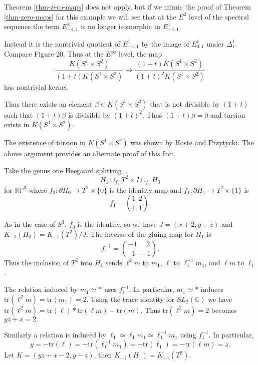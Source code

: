 \documentclass{slides}
\newcommand{\tr}{\mathrm{tr}}
\newcommand{\slc}{SL_2(\mathbb{C})}
\begin{document}
\begin{slide}
Theorem \ref{thm-zero-maps} does not apply, but if we mimic the proof
of Theorem \ref{thm-zero-maps} for this example
we will see that at the $E^2$ level of the spectral sequence the term
$E^2_{-1,1}$ is no longer isomorphic to $E^1_{-1,1}$.

Instead it is the nontrivial
quotient of $E^1_{-1,1}$ by the image of $E^1_{0,1}$ under $\Delta^1_1$.  Compare
Figure 20.  Thus at the $E^{\infty}$ level, the map
\[
\frac{K(S^1 \times S^2)}{(1+t)K(S^1 \times S^2)} \to
\frac{(1+t)K(S^1 \times S^2)}{(1+t)^2K(S^1 \times S^2)}
\]
has nontrivial kernel.

Thus there exists an element $\beta \in K(S^1 \times S^2)$
that is not divisible by $(1+t)$ such that $(1+t) \beta$ is divisible by $(1+t)^2$.
Thus $(1+t) \beta = 0$ and torsion exists in $K(S^1 \times S^2)$.

The existence of torsion in $K(S^1 \times S^2)$ was shown by Hoste and Przytycki.
The above argument provides an alternate proof of this fact.
\end{slide}

\begin{slide}

Take the genus one Heegaard splitting
$$H_1 \cup_{f_1} T^2 \times I \cup_{f_0} H_0$$ for $\mathbb{RP}^3$ where
$f_0 : \partial H_0 \to T^2 \times \{0\}$ is the identity
map and
$f_1 : \partial H_1 \to T^2 \times \{1\}$ is
$$f_1 = \binom{1~~2}{1~~1}.$$

As in the case of $S^3$, $f_0$ is the identity, so we have
$J = (x+2, y-z)$ and $K_{-1}(H_0) = K_{-1}(T^2) / J$.
The inverse of the gluing map for $H_1$ is
\[f^{-1}_1 = \binom{-1~~~~~~2}{~~~1~~-1}.\]  Thus the inclusion of $T^2$ into $H_1$
sends $\ell^2 m$ to $m_1$, $\ell$ to $\ell_1^{-1} m_1$, and
$\ell m$ to $\ell_1$.
\end{slide}

\begin{slide}
The relation induced by $m_1 \simeq *$ uses $f_1^{-1}$.
In particular, $m_1 \simeq *$ induces
$\tr(\ell^2 m) = \tr(m_1) = 2$.  Using the trace identity for
$\slc$ we have
$\tr(\ell^2 m) = \tr(\ell)*\tr(\ell m) - \tr(m)$.
Thus $\tr(\ell^2 m) = 2$ becomes $yz+x = 2.$

Similarly a relation is induced
by $\ell_1 \simeq \ell_1 m_1 \simeq \ell_1^{-1} m_1$ using $f_1^{-1}$.
In particular,
\[y = -\tr(\ell) = -\tr(\ell_1^{-1} m_1) = -\tr(\ell_1) = -\tr(\ell m) = z.\]
Let $K = (yz+x-2, y-z)$, then $K_{-1}(H_1) = K_{-1}(T^2)$.
\end{slide}
\end{document}
